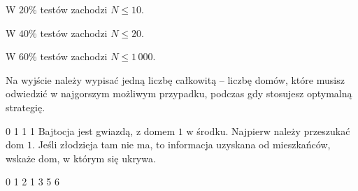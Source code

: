 W $20\%$ testów zachodzi $N \le 10$.

W $40\%$ testów zachodzi $N \le 20$.

W $60\%$ testów zachodzi $N \le 1\,000$.


Na wyjście należy wypisać jedną liczbę całkowitą -- liczbę domów, które musisz odwiedzić w najgorszym możliwym przypadku,
	podczas gdy stosujesz optymalną strategię.


0 1 1 1
\sampleCOMMENT
Bajtocja jest gwiazdą, z domem $1$ w środku.
\sampleCOMMENT
Najpierw należy przeszukać dom $1$.
Jeśli złodzieja tam nie ma, to informacja uzyskana od mieszkańców, wskaże dom, w którym się ukrywa.
\sampleEND

0 1 2 1 3 5 6
\sampleEND


